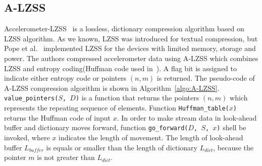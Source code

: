 
\subsection{A-LZSS}
Accelerometer-LZSS~\cite{pope2018accelerometer} is a lossless, dictionary
compression algorithm based on LZSS algorithm. As we known, LZSS was introduced
for textual compression, but Pope et al.~\cite{pope2018accelerometer}
implemented LZSS for the devices with limited memory, storage and power. The
authors compressed accelerometer data using A-LZSS which combines LZSS and
entropy coding(Huffman code used in~\cite{pope2018accelerometer}). A flag bit is
assigned to indicate either entropy code or pointers $(n, m)$ is returned. The
pseudo-code of A-LZSS compression algorithm is shown in
Algorithm~\ref{algo:A-LZSS}. \texttt{value\_pointers($S$, $D$)} is a function
that returns the pointers $(n, m)$ which represents the repeating sequence of
elements. Function \texttt{Huffman\_table($x$)} returns the Huffman code of
input $x$. In order to make stream data in look-ahead buffer and dictionary
moves forward, function \texttt{go\_forward($D$, $S$, $x$)} shell be invoked,
where $x$ indicates the length of movement. The length of look-ahead buffer
$L_{buffer}$ is equals or smaller than the length of dictionary $L_{dict}$,
because the pointer $m$ is not greater than $L_{dict}$. 

